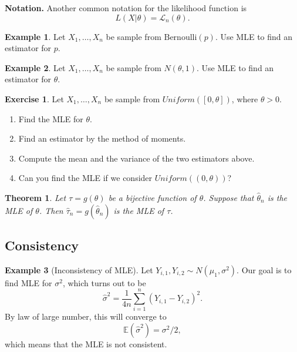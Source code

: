 \documentclass[
  openany]{book}
\newtheorem{theorem}{Theorem}[chapter]
\theoremstyle{definition}
\theoremstyle{definition}
\newtheorem{example}{Example}[chapter]
\theoremstyle{definition}
\newtheorem{exercise}{Exercise}[chapter]
\theoremstyle{definition}
\theoremstyle{remark}
\begin{document}
\textbf{Notation.} Another common notation for the likelihood function is
\[ L(X|\theta) = \mathcal{L}_n(\theta).\]

\begin{example}
Let \(X_1, \dots, X_n\) be sample from \(\mathrm{Bernoulli}(p)\).
Use MLE to find an estimator for \(p\).
\end{example}

\begin{example}
Let \(X_1, \dots, X_n\) be sample from \(N(\theta, 1)\).
Use MLE to find an estimator for \(\theta\).
\end{example}

\begin{exercise}

Let \(X_1, \dots, X_n\) be sample from \(Uniform([0,\theta])\), where \(\theta >0\).

\begin{enumerate}
\def\labelenumi{\arabic{enumi}.}
\item
  Find the MLE for \(\theta\).
\item
  Find an estimator by the method of moments.
\item
  Compute the mean and the variance of the two estimators above.
\item
  Can you find the MLE if we consider \(Uniform((0,\theta))\)?
\end{enumerate}

\end{exercise}

\begin{theorem}
Let \(\tau = g(\theta)\) be a bijective function of \(\theta\).
Suppose that \(\hat \theta_n\) is the MLE of \(\theta\).
Then \(\hat \tau_n = g(\hat \theta_n)\) is the MLE of \(\tau\).
\end{theorem}

\hypertarget{consistency}{%
\subsection{Consistency}\label{consistency}}

\begin{example}[Inconsistency of MLE]
Let \(Y_{i,1}, Y_{i,2} \sim N(\mu_1, \sigma^2)\). Our goal is to find MLE for \(\sigma^2\), which
turns out to be
\[\hat \sigma^2 = \frac{1}{4n} \sum_{i=1}^n (Y_{i,1} - Y_{i,2})^2.\]
By law of large number, this will converge to
\[\mathbb{E}(\hat \sigma^2) = \sigma^2/2,\]
which means that the MLE is not consistent.
\end{example}
\end{document}
